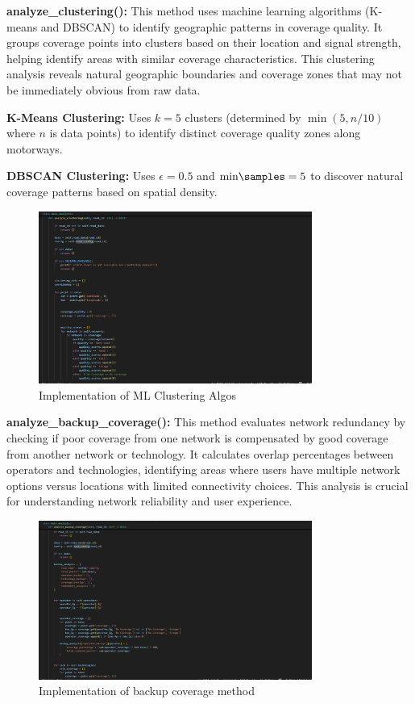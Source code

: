 \documentclass[MScCS]{uccthesis}
\begin{document}
\textbf{analyze\_clustering():}
This method uses machine learning algorithms (K-means and DBSCAN) to identify geographic patterns in coverage quality. It groups coverage points into clusters based on their location and signal strength, helping identify areas with similar coverage characteristics. This clustering analysis reveals natural geographic boundaries and coverage zones that may not be immediately obvious from raw data.

\textbf{K-Means Clustering:} Uses $k=5$ clusters (determined by $\min(5, n/10)$ where $n$ is data points) to identify distinct coverage quality zones along motorways.


\textbf{DBSCAN Clustering:} Uses $\epsilon=0.5$ and $\text{min\samples}=5$ to discover natural coverage patterns based on spatial density.

\begin{figure}[H]
   \centering
   \includegraphics[width=0.8\textwidth]{Images/analyze_clustering.png}
   \caption{Implementation of ML Clustering Algos}
   \label{fig:analyze_clustering}
   \end{figure}

   

\textbf{analyze\_backup\_coverage():}
This method evaluates network redundancy by checking if poor coverage from one network is compensated by good coverage from another network or technology. It calculates overlap percentages between operators and technologies, identifying areas where users have multiple network options versus locations with limited connectivity choices. This analysis is crucial for understanding network reliability and user experience.

\begin{figure}[H]
   \centering
   \includegraphics[width=0.8\textwidth]{Images/analyze_backup_coverage.png}
   \caption{Implementation of backup coverage method}
   \label{fig:analyze_backup_coverage}
   \end{figure}
   
\end{document}
